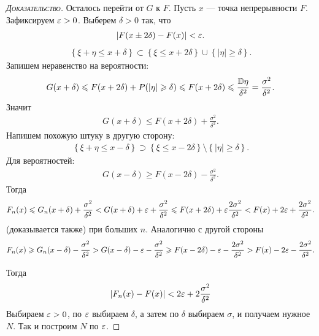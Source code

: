 \documentclass[../main.tex]{subfiles}
\begin{document}
\begin{proof}[\normalfont\textsc{Доказательство}]
 Осталось перейти от $ G $ к $ F $. Пусть $ x $ --- точка непрерывности $ F $. Зафиксируем $ \varepsilon  > 0 $. Выберем $ \delta > 0 $ так, что 
 \begin{align*}
  \left| F(x \pm 2\delta) - F(x) \right| < \varepsilon.
 \end{align*}
 \begin{align*}
  \left\{ \xi+\eta \leqslant x  + \delta \right\} \subset \left\{ \xi \leqslant x + 2\delta \right\} \cup \left\{ \left| \eta \right| \geqslant \delta \right\}.
 \end{align*} Запишем неравенство на вероятности:
 \begin{align*}
  G(x+\delta) \leqslant F(x+2\delta) + P(\left| \eta \right| \geqslant \delta) \leqslant F(x+2\delta) \leqslant \frac{\mathbb D \eta}{\delta^{2}} = \frac{\sigma^{2}}{\delta^{2}}.
 \end{align*} Значит
 \begin{align*}
  G(x+\delta) \leqslant F(x+2\delta) + \frac{\sigma^{2}}{\delta^{2}}.
 \end{align*} Напишем похожую штуку в другую сторону:
 \begin{align*}
  \left\{ \xi +\eta \leqslant x - \delta \right\} \supset \left\{ \xi \leqslant x - 2\delta \right\} \setminus \left\{ \left| \eta \right| \geqslant \delta \right\}.
 \end{align*} Для вероятностей:
 \begin{align*}
  G(x-\delta) \geqslant F(x - 2\delta) - \frac{\sigma^{2}}{\delta^{2}}.
 \end{align*} Тогда
 \begin{align*}
  F_n(x) \leqslant G_n(x+\delta) + \frac{\sigma^{2}}{\delta^{2}} < G(x+\delta) + \varepsilon + \frac{\sigma^{2}}{\delta^{2}} \leqslant F(x+2\delta) + \varepsilon \frac{2\sigma^{2}}{\delta^{2}} < F(x) + 2\varepsilon + \frac{2\sigma^{2}}{\delta^{2}}.
 \end{align*} (доказывается также) при больших $ n $. Аналогично с другой стороны
 \begin{align*}
  F_n(x) \geqslant G_n(x - \delta) - \frac{\sigma^{2}}{\delta^{2}} > G(x-\delta) - \varepsilon - \frac{\sigma^{2}}{\delta^{2}} \geqslant F(x - 2\delta) - \varepsilon - \frac{2\sigma^{2}}{\delta^{2}}  > F(x) - 2\varepsilon - \frac{2\sigma^{2}}{\delta^{2}}.
 \end{align*}

 Тогда
 \begin{align*}
  \left| F_n(x) - F(x) \right| < 2\varepsilon + 2 \frac{\sigma^{2}}{\delta^{2}}
 \end{align*} Выбираем $ \varepsilon > 0$, по $ \varepsilon $ выбираем $ \delta $,  а затем по $ \delta $ выбираем $ \sigma $, и получаем нужное $ N $. Так и построим $ N $ по $ \varepsilon $.

\end{proof}
\end{document}
